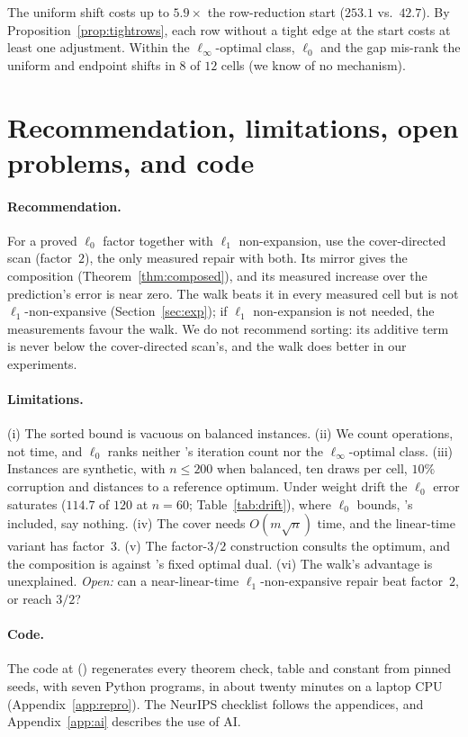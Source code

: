 The uniform shift costs up to $5.9\times$ the row-reduction start ($253.1$ vs.\ $42.7$). By
Proposition~\ref{prop:tightrows}, each row without a tight edge at the start costs at least one
adjustment. Within the $\ell_\infty$-optimal class, $\ell_0$ and the gap
mis-rank the uniform and endpoint shifts in $8$ of $12$ cells (we know of no mechanism).

\section{Recommendation, limitations, open problems, and code}\label{sec:discussion}

\paragraph{Recommendation.} For a proved $\ell_0$ factor together with $\ell_1$
non-expansion, use the cover-directed scan (factor~$2$), the only measured repair with both. Its
mirror gives the composition (Theorem~\ref{thm:composed}), and its measured increase over the
prediction's error is near zero. The walk beats it in every measured cell but is not
$\ell_1$-non-expansive (Section~\ref{sec:exp}); if $\ell_1$ non-expansion is not needed, the
measurements favour the walk. We do not recommend
sorting: its additive term is never below the cover-directed scan's, and the walk does better in
our experiments.

\paragraph{Limitations.} (i) The sorted bound is vacuous on balanced instances. (ii) We count
operations, not time, and $\ell_0$ ranks neither \mbox{\citeauthor{chen2022}}'s iteration count
nor the $\ell_\infty$-optimal class. (iii) Instances are synthetic, with $n \le 200$ when balanced, ten draws per cell, $10\%$ corruption and distances to
a reference optimum. Under weight drift the $\ell_0$ error saturates ($114.7$ of $120$ at $n = 60$;
Table~\ref{tab:drift}), where $\ell_0$ bounds, \mbox{\citeauthor{chen2022}}'s included, say
nothing. (iv) The cover needs $O(m\sqrt n)$ time, and the linear-time variant has factor~$3$.
(v) The factor-$3/2$ construction consults the optimum, and the composition is against
\mbox{\citeauthor{chen2022}}'s fixed optimal dual. (vi) The walk's advantage is unexplained.
\emph{Open:} can a near-linear-time $\ell_1$-non-expansive repair beat factor~$2$, or reach $3/2$?

\paragraph{Code.} The code at \coderepo{} (\codelicence) regenerates every theorem check, table and
constant from pinned seeds, with seven Python programs, in about twenty minutes on a laptop CPU
(Appendix~\ref{app:repro}). The NeurIPS checklist follows the appendices, and Appendix~\ref{app:ai} describes the use of AI.
